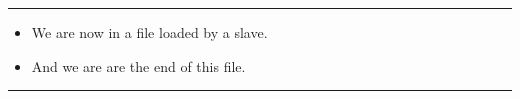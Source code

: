 \documentclass[main.tex]{subfiles}
\begin{document}
\medskip
\hrule
\begin{itemize}

\item 
We are now in a file loaded by a slave.

\item
And we are are the end of this file.

\end{itemize}
\hrule
\medskip
\end{document}
